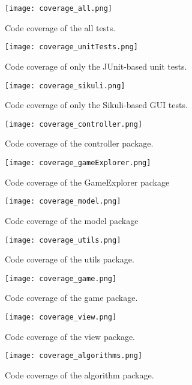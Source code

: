 \begin{figure}[!h]
	\centering
	\texttt{[image: coverage\_all.png]}
	\caption{Code coverage of the all tests.}
	\label{img:codeCoverageAll}
\end{figure}

\begin{figure}[!h]
	\centering
	\texttt{[image: coverage\_unitTests.png]}
	\caption{Code coverage of only the JUnit-based unit tests.}
	\label{img:codeCoverageJUnit}
\end{figure}

\begin{figure}[!h]
	\centering
	\texttt{[image: coverage\_sikuli.png]}
	\caption{Code coverage of only the Sikuli-based GUI tests.}
	\label{img:codeCoverageSikuli}
\end{figure}

\begin{figure}[!h]
	\centering
	\texttt{[image: coverage\_controller.png]}
	\caption{Code coverage of the controller package.}
	\label{img:codeCoverageController}
\end{figure}

\begin{figure}[!h]
	\centering
	\texttt{[image: coverage\_gameExplorer.png]}
	\caption{Code coverage of the GameExplorer package}
	\label{img:codeCoverageGameExplorer}
\end{figure}

\begin{figure}[!h]
	\centering
	\texttt{[image: coverage\_model.png]}
	\caption{Code coverage of the model package}
	\label{img:codeCoverageModel}
\end{figure}

\begin{figure}[!h]
	\centering
	\texttt{[image: coverage\_utils.png]}
	\caption{Code coverage of the utils package.}
	\label{img:codeCoverageUtils}
\end{figure}

\begin{figure}[!h]
	\centering
	\texttt{[image: coverage\_game.png]}
	\caption{Code coverage of the game package.}
	\label{img:codeCoverageGame}
\end{figure}

\begin{figure}[!h]
	\centering
	\texttt{[image: coverage\_view.png]}
	\caption{Code coverage of the view package.}
	\label{img:codeCoverageView}
\end{figure}

\begin{figure}[!h]
	\centering
	\texttt{[image: coverage\_algorithms.png]}
	\caption{Code coverage of the algorithm package.}
	\label{img:codeCoverageAlgorithms}
\end{figure}